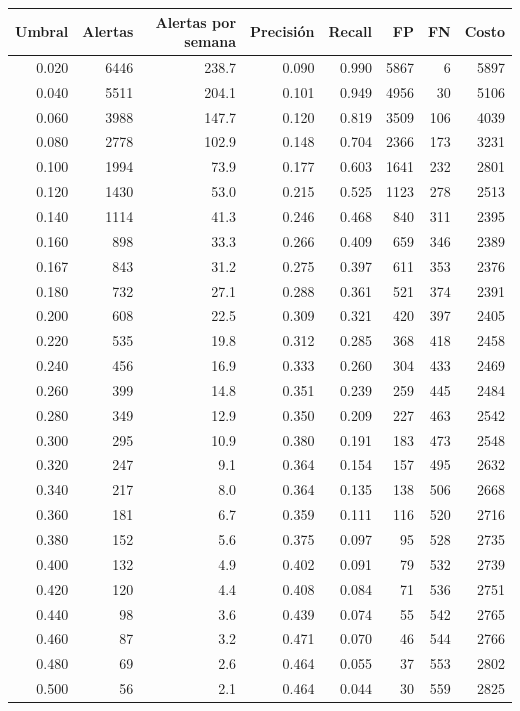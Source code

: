 \begin{tabular}{rrrrrrrr}
\toprule
Umbral & Alertas & Alertas por semana & Precisión & Recall & FP & FN & Costo \\
\midrule
0.020 & 6446 & 238.7 & 0.090 & 0.990 & 5867 & 6 & 5897 \\
0.040 & 5511 & 204.1 & 0.101 & 0.949 & 4956 & 30 & 5106 \\
0.060 & 3988 & 147.7 & 0.120 & 0.819 & 3509 & 106 & 4039 \\
0.080 & 2778 & 102.9 & 0.148 & 0.704 & 2366 & 173 & 3231 \\
0.100 & 1994 & 73.9 & 0.177 & 0.603 & 1641 & 232 & 2801 \\
0.120 & 1430 & 53.0 & 0.215 & 0.525 & 1123 & 278 & 2513 \\
0.140 & 1114 & 41.3 & 0.246 & 0.468 & 840 & 311 & 2395 \\
0.160 & 898 & 33.3 & 0.266 & 0.409 & 659 & 346 & 2389 \\
0.167 & 843 & 31.2 & 0.275 & 0.397 & 611 & 353 & 2376 \\
0.180 & 732 & 27.1 & 0.288 & 0.361 & 521 & 374 & 2391 \\
0.200 & 608 & 22.5 & 0.309 & 0.321 & 420 & 397 & 2405 \\
0.220 & 535 & 19.8 & 0.312 & 0.285 & 368 & 418 & 2458 \\
0.240 & 456 & 16.9 & 0.333 & 0.260 & 304 & 433 & 2469 \\
0.260 & 399 & 14.8 & 0.351 & 0.239 & 259 & 445 & 2484 \\
0.280 & 349 & 12.9 & 0.350 & 0.209 & 227 & 463 & 2542 \\
0.300 & 295 & 10.9 & 0.380 & 0.191 & 183 & 473 & 2548 \\
0.320 & 247 & 9.1 & 0.364 & 0.154 & 157 & 495 & 2632 \\
0.340 & 217 & 8.0 & 0.364 & 0.135 & 138 & 506 & 2668 \\
0.360 & 181 & 6.7 & 0.359 & 0.111 & 116 & 520 & 2716 \\
0.380 & 152 & 5.6 & 0.375 & 0.097 & 95 & 528 & 2735 \\
0.400 & 132 & 4.9 & 0.402 & 0.091 & 79 & 532 & 2739 \\
0.420 & 120 & 4.4 & 0.408 & 0.084 & 71 & 536 & 2751 \\
0.440 & 98 & 3.6 & 0.439 & 0.074 & 55 & 542 & 2765 \\
0.460 & 87 & 3.2 & 0.471 & 0.070 & 46 & 544 & 2766 \\
0.480 & 69 & 2.6 & 0.464 & 0.055 & 37 & 553 & 2802 \\
0.500 & 56 & 2.1 & 0.464 & 0.044 & 30 & 559 & 2825 \\
\bottomrule
\end{tabular}
